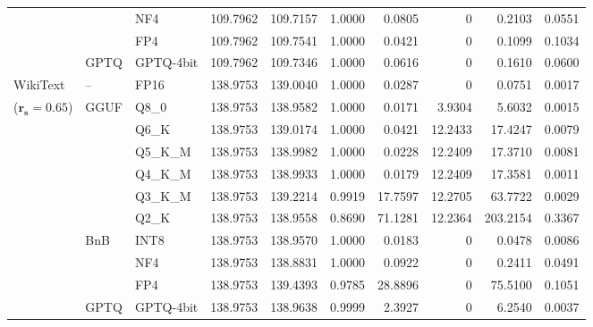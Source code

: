 \begin{table}[t]
{\begin{tabular}{ll l rrrrrrr}
 &  & NF4 & 109.7962 & 109.7157 & 1.0000 & 0.0805 & \cellcolor{cyan!12} $0$ & 0.2103 & 0.0551 \\
 &  & FP4 & 109.7962 & 109.7541 & 1.0000 & 0.0421 & \cellcolor{cyan!12} $0$ & 0.1099 & 0.1034 \\
 & GPTQ & GPTQ-4bit & 109.7962 & 109.7346 & 1.0000 & 0.0616 & \cellcolor{cyan!12} $0$ & 0.1610 & 0.0600 \\
\midrule
WikiText & -- & FP16 & 138.9753 & 139.0040 & 1.0000 & 0.0287 & \cellcolor{cyan!12} $0$ & 0.0751 & 0.0017 \\
{\small ($\mathbf{r_s{=}0.65}$)} & GGUF & Q8\_0 & 138.9753 & 138.9582 & 1.0000 & 0.0171 & 3.9304 & 5.6032 & 0.0015 \\
 &  & Q6\_K & 138.9753 & 139.0174 & 1.0000 & 0.0421 & 12.2433 & 17.4247 & 0.0079 \\
 &  & Q5\_K\_M & 138.9753 & 138.9982 & 1.0000 & 0.0228 & 12.2409 & 17.3710 & 0.0081 \\
 &  & Q4\_K\_M & 138.9753 & 138.9933 & 1.0000 & 0.0179 & 12.2409 & 17.3581 & 0.0011 \\
 &  & Q3\_K\_M & 138.9753 & 139.2214 & 0.9919 & 17.7597 & 12.2705 & 63.7722 & 0.0029 \\
 &  & Q2\_K & 138.9753 & 138.9558 & \cellcolor{red!18} 0.8690 & \cellcolor{red!18} 71.1281 & 12.2364 & \cellcolor{red!18} 203.2154 & \cellcolor{red!18} 0.3367 \\
 & BnB & INT8 & 138.9753 & 138.9570 & 1.0000 & 0.0183 & \cellcolor{cyan!12} $0$ & 0.0478 & 0.0086 \\
 &  & NF4 & 138.9753 & 138.8831 & 1.0000 & 0.0922 & \cellcolor{cyan!12} $0$ & 0.2411 & 0.0491 \\
 &  & FP4 & 138.9753 & 139.4393 & 0.9785 & 28.8896 & \cellcolor{cyan!12} $0$ & 75.5100 & 0.1051 \\
 & GPTQ & GPTQ-4bit & 138.9753 & 138.9638 & 0.9999 & 2.3927 & \cellcolor{cyan!12} $0$ & 6.2540 & 0.0037 \\
\bottomrule
\end{tabular}}
\end{table}